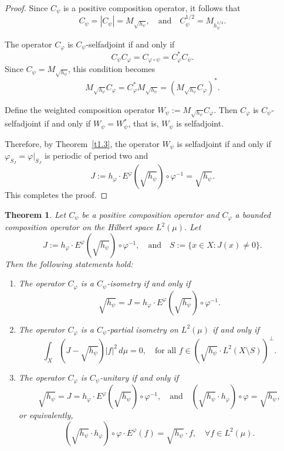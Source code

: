 \documentclass{amsart}
\newtheorem{thm}{Theorem}[section]
\theoremstyle{definition}\newtheorem{defn}[thm]{Definition}
\theoremstyle{remark}
\numberwithin{equation}{section}
\begin{document}
\begin{proof}
Since \( C_{\psi} \) is a positive composition operator, it follows that
\[
C_{\psi} = |C_{\psi}| = M_{\sqrt{h_{\psi}}}, \quad \text{and} \quad C_{\psi}^{1/2} = M_{h_{\psi}^{1/4}}.
\]

The operator \( C_{\varphi} \) is \( C_{\psi} \)-selfadjoint if and only if
\[
C_{\psi} C_{\varphi} = C_{\varphi \circ \psi} = C_{\varphi}^* C_{\psi}.
\]
Since \( C_{\psi} = M_{\sqrt{h_{\psi}}} \), this condition becomes
\[
M_{\sqrt{h_{\psi}}} C_{\varphi} = C_{\varphi}^* M_{\sqrt{h_{\psi}}} = (M_{\sqrt{h_{\psi}}} C_{\varphi})^*.
\]

Define the weighted composition operator \( W_{\psi} := M_{\sqrt{h_{\psi}}} C_{\varphi} \). Then \( C_{\varphi} \) is \( C_{\psi} \)-selfadjoint if and only if \( W_{\psi} = W_{\psi}^* \), that is, \( W_{\psi} \) is selfadjoint.

Therefore, by Theorem~\ref{t1.3}, the operator \( W_{\psi} \) is selfadjoint if and only if \( \varphi_{S_J} = \varphi|_{S_J} \) is periodic of period two and
\[
J := h_{\varphi} \cdot E^{\varphi}(\sqrt{h_{\psi}}) \circ \varphi^{-1} = \sqrt{h_{\psi}}.
\]
This completes the proof.
\end{proof}
\begin{thm}\label{t1.10}
Let \( C_{\psi} \) be a positive composition operator and \( C_{\varphi} \) a bounded composition operator on the Hilbert space \( L^2(\mu) \). Let
\[
J := h_{\varphi} \cdot E^{\varphi}(\sqrt{h_{\psi}}) \circ \varphi^{-1}, \quad \text{and} \quad S := \{ x \in X : J(x) \neq 0 \}.
\]
Then the following statements hold:

\begin{enumerate}
    \item[(a)] The operator \( C_{\varphi} \) is a \( C_{\psi} \)-isometry if and only if
    \[
    \sqrt{h_{\psi}} = J = h_{\varphi} \cdot E^{\varphi}(\sqrt{h_{\psi}}) \circ \varphi^{-1}.
    \]

    \item[(b)] The operator \( C_{\varphi} \) is a \( C_{\psi} \)-partial isometry on \( L^2(\mu) \) if and only if
    \[
    \int_X (J - \sqrt{h_{\psi}}) |f|^2 \, d\mu = 0, \quad \text{for all } f \in \left( \sqrt{h_{\psi}} \cdot L^2(X \setminus S) \right)^{\perp}.
    \]

    \item[(c)] The operator \( C_{\varphi} \) is \( C_{\psi} \)-unitary if and only if
    \[
    \sqrt{h_{\psi}} = J = h_{\varphi} \cdot E^{\varphi}(\sqrt{h_{\psi}}) \circ \varphi^{-1}, \quad \text{and} \quad \left( \sqrt{h_{\psi}} \cdot h_{\varphi} \right) \circ \varphi = \sqrt{h_{\psi}},
    \]
    or equivalently,
    \[
    \left( \sqrt{h_{\psi}} \cdot h_{\varphi} \right) \circ \varphi \cdot E^{\varphi}(f) = \sqrt{h_{\psi}} \cdot f, \quad \forall f \in L^2(\mu).
    \]
\end{enumerate}
\end{thm}
\end{document}
